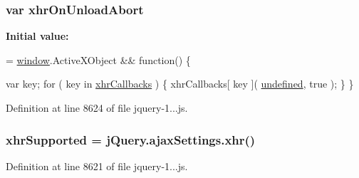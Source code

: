 \subsubsection[{xhr\+On\+Unload\+Abort}]{\setlength{\rightskip}{0pt plus 5cm}var xhr\+On\+Unload\+Abort}\label{obj_2_release_2_package_2_package_tmp_2_scripts_2jquery-1_810_82_8js_a271c099ab18ab35c15cac2faa2a097aa}
{\bfseries Initial value\+:}
\begin{DoxyCode}
= \hyperlink{obj_2_release_2_package_2_package_tmp_2_scripts_2jquery-1_810_82_8js_a04a8a2bbfa9c15500892b8e5033d625b}{window}.ActiveXObject && \textcolor{keyword}{function}() \{
        
        var key;
        \textcolor{keywordflow}{for} ( key in \hyperlink{obj_2_release_2_package_2_package_tmp_2_scripts_2jquery-1_810_82_8js_a068f27a70831ff3a9e0ffa79e063847f}{xhrCallbacks} ) \{
            xhrCallbacks[ key ]( \hyperlink{obj_2_release_2_package_2_package_tmp_2_scripts_2jquery-1_810_82_8js_a08113a236cc18d2a9d5ce27e638012be}{undefined}, true );
        \}
    \}
\end{DoxyCode}


Definition at line 8624 of file jquery-\/1...\+js.

\hypertarget{obj_2_release_2_package_2_package_tmp_2_scripts_2jquery-1_810_82_8js_afd7e72f2f357a5a8b17e46776a6283eb}{}
\subsubsection[{xhr\+Supported}]{\setlength{\rightskip}{0pt plus 5cm}xhr\+Supported = {\bf j\+Query.\+ajax\+Settings.\+xhr}()}\label{obj_2_release_2_package_2_package_tmp_2_scripts_2jquery-1_810_82_8js_afd7e72f2f357a5a8b17e46776a6283eb}


Definition at line 8621 of file jquery-\/1...\+js.


